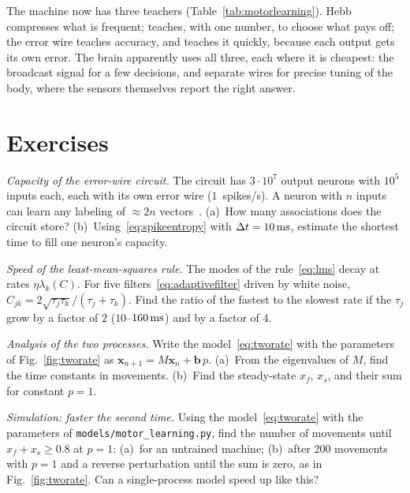 The machine now has three teachers (Table~\ref{tab:motorlearning}). Hebb compresses what is frequent;  teaches, with one number, to choose what pays off; the error wire teaches accuracy, and teaches it quickly, because each output gets its own error. The brain apparently uses all three, each where it is cheapest: the broadcast signal for a few decisions, and separate wires for precise tuning of the body, where the sensors themselves report the right answer.

\section{Exercises}

\begin{exercise}[\lvlA]
\label{ex:15:1}
\emph{Capacity of the error-wire circuit.} The circuit has $3\cdot10^7$ output neurons with $10^5$ inputs each, each with its own error wire ($1$~spikes/s). A neuron with $n$ inputs can learn any labeling of $\approx2n$ vectors~\cite{Cover1965}. (a)~How many associations does the circuit store? (b)~Using~\eqref{eq:spikeentropy} with $\Delta t=10\,\text{ms}$, estimate the shortest time to fill one neuron's capacity.
\end{exercise}

\begin{exercise}[\lvlB]
\label{ex:15:2}
\emph{Speed of the least-mean-squares rule.} The modes of the rule~\eqref{eq:lms} decay at rates $\eta\lambda_k(C)$. For five filters~\eqref{eq:adaptivefilter} driven by white noise, $C_{jk}=2\sqrt{\tau_j\tau_k}/(\tau_j+\tau_k)$. Find the ratio of the fastest to the slowest rate if the $\tau_j$ grow by a factor of $2$ ($10$--$160\,\text{ms}$) and by a factor of $4$.
\end{exercise}

\begin{exercise}[\lvlB]
\label{ex:15:3}
\emph{Analysis of the two processes.} Write the model~\eqref{eq:tworate} with the parameters of Fig.~\ref{fig:tworate} as $\mathbf x_{n+1}=M\mathbf x_n+\mathbf b\,p$. (a)~From the eigenvalues of $M$, find the time constants in movements. (b)~Find the steady-state $x_f$, $x_s$, and their sum for constant $p=1$.
\end{exercise}

\begin{exercise}[\lvlB]
\label{ex:15:4}
\emph{Simulation: faster the second time.} Using the model~\eqref{eq:tworate} with the parameters of \texttt{models/\allowbreak motor\_learning.py}, find the number of movements until $x_f+x_s\ge0.8$ at $p=1$: (a)~for an untrained machine; (b)~after $200$ movements with $p=1$ and a reverse perturbation until the sum is zero, as in Fig.~\ref{fig:tworate}. Can a single-process model speed up like this?
\end{exercise}

